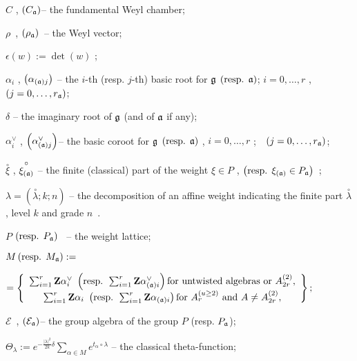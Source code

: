 \documentclass[a4paper,12pt]{article}
\theoremstyle{definition} \newtheorem{Def}{Definition}
\begin{document}
$C$ , $\left( C_{\frak{a}}\right) $-- the fundamental Weyl chamber;

$\rho $\ , $\left( \rho _{\frak{a}}\right) $\ -- the Weyl vector;

$\epsilon \left( w\right) :=\det \left( w\right) $ ;

$\alpha _{i}$ , $\left( \alpha _{\left( \frak{a}\right) j}\right) $ -- the $i
$-th (resp. $j$-th) basic root for $\frak{g}$ $\left( \text{resp. }\frak{a}%
\right) $; $i=0,\ldots ,r$ ,\ \ $\left( j=0,\ldots ,r_{\frak{a}}\right) $;

$\delta $ -- the imaginary root of $\frak{g}$ (and of $\frak{a}$ if any);

$\alpha _{i}^{\vee }$ , $\left( \alpha _{\left( \frak{a}\right) j}^{\vee
}\right) $-- the basic coroot for $\frak{g}$ $\left( \text{resp. }\frak{a}%
\right) $ , $i=0,\ldots ,r$ ;\ \ $\left( j=0,\ldots ,r_{\frak{a}}\right) $;

$\overset{\circ }{\xi }$ , $\overset{\circ }{\xi _{\left( \frak{a}\right) }}$
-- the finite (classical) part of the weight $\xi \in P$ , $\left( \text{%
resp. }\xi _{\left( \frak{a}\right) }\in P_{\frak{a}}\right) $\ ;

$\lambda =\left( \overset{\circ }{\lambda };k;n\right) $ -- the
decomposition of an affine weight indicating the finite part $\overset{\circ 
}{\lambda }$, level $k$ and grade $n$\ .

$P$ $\left( \text{resp. } P_{\frak{a}}\right) $ \ -- the weight lattice;

$M \left( \text{resp. }M_{\frak{a}}\right) :=$

\noindent $=\left\{ 
\begin{array}{c}
\sum_{i=1}^{r}\mathbf{Z}\alpha _{i}^{\vee }\text{ }\left( \text{resp. }%
\sum_{i=1}^{r}\mathbf{Z}\alpha _{\left( \frak{a}\right) i}^{\vee }\right) 
\text{for untwisted algebras or }A_{2r}^{\left( 2\right) }, \\ 
\sum_{i=1}^{r}\mathbf{Z}\alpha _{i}\text{ }\left( \text{resp. }\sum_{i=1}^{r}%
\mathbf{Z}\alpha _{\left( \frak{a}\right) i}\right) \text{for }A_{r}^{\left(
u\geq 2\right) }\text{ and }A\neq A_{2r}^{\left( 2\right) },
\end{array}
\right\} ;$

$\mathcal{E}$\ , $\left( \mathcal{E}_{\frak{a}}\right) $-- the group algebra
of the group $P$ (resp. $P_{\frak{a}} $);

$\Theta _{\lambda }:=e^{-\frac{\left| \lambda \right| ^{2}}{2k}\delta
}\sum\limits_{\alpha \in M}e^{t_{\alpha }\circ \lambda }$ -- the classical
theta-function;
\end{document}
